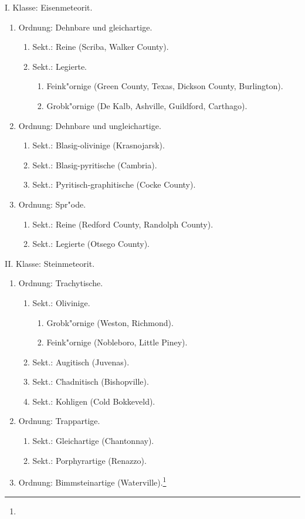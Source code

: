 \documentclass[a4paper, 11pt, oneside]{article}
\begin{document}
\begin{center}
I. Klasse: Eisenmeteorit.
\end{center}
\begin{enumerate}
  \item Ordnung: Dehnbare und gleichartige.
  \begin{enumerate}
    \item Sekt.: Reine (Scriba, Walker County).
    \item Sekt.: Legierte.
    \begin{enumerate}
      \item Feink"ornige (Green County, Texas, Dickson County, Burlington).
      \item Grobk"ornige (De Kalb, Ashville, Guildford, Carthago).
    \end{enumerate}
  \end{enumerate}
  \item Ordnung: Dehnbare und ungleichartige.
  \begin{enumerate}
    \item Sekt.: Blasig-olivinige (Krasnojarsk).
    \item Sekt.: Blasig-pyritische (Cambria).
    \item Sekt.: Pyritisch-graphitische (Cocke County).
  \end{enumerate}
  \item Ordnung: Spr"ode.
  \begin{enumerate}
    \item Sekt.: Reine (Redford County, Randolph County).
    \item Sekt.: Legierte (Otsego County).
  \end{enumerate}
\end{enumerate}

\begin{center}
II. Klasse: Steinmeteorit.
\end{center}
\begin{enumerate}
  \item Ordnung: Trachytische.
  \begin{enumerate}
    \item Sekt.: Olivinige.
    \begin{enumerate}
      \item Grobk"ornige (Weston, Richmond).
      \item Feink"ornige (Nobleboro, Little Piney).
    \end{enumerate}
    \item Sekt.: Augitisch (Juvenas).
    \item Sekt.: Chadnitisch (Bishopville).
    \item Sekt.: Kohligen (Cold Bokkeveld).
  \end{enumerate}
  \item Ordnung: Trappartige.
  \begin{enumerate}
    \item Sekt.: Gleichartige (Chantonnay).
    \item Sekt.: Porphyrartige (Renazzo).
  \end{enumerate}
  \item Ordnung: Bimmsteinartige (Waterville).\footnote{}
\end{enumerate}
\end{document}
